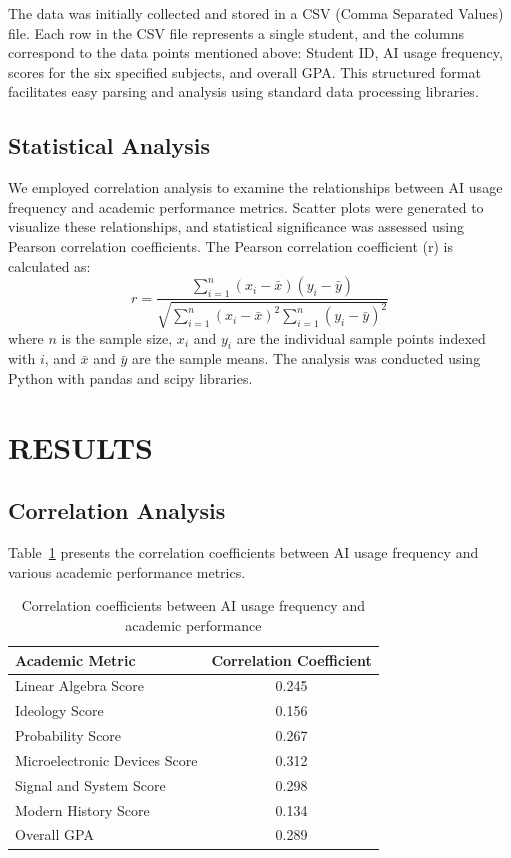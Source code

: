 \documentclass[manuscript,screen,review]{acmart}
\begin{document}
The data was initially collected and stored in a CSV (Comma Separated Values) file. Each row in the CSV file represents a single student, and the columns correspond to the data points mentioned above: Student ID, AI usage frequency, scores for the six specified subjects, and overall GPA. This structured format facilitates easy parsing and analysis using standard data processing libraries.

\subsection{Statistical Analysis}

We employed correlation analysis to examine the relationships between AI usage frequency and academic performance metrics. Scatter plots were generated to visualize these relationships, and statistical significance was assessed using Pearson correlation coefficients. The Pearson correlation coefficient (r) is calculated as:
$$r = \frac{\sum_{i=1}^{n}(x_i - \bar{x})(y_i - \bar{y})}{\sqrt{\sum_{i=1}^{n}(x_i - \bar{x})^2 \sum_{i=1}^{n}(y_i - \bar{y})^2}}$$
where $n$ is the sample size, $x_i$ and $y_i$ are the individual sample points indexed with $i$, and $\bar{x}$ and $\bar{y}$ are the sample means. The analysis was conducted using Python with pandas and scipy libraries.

\section{RESULTS}

\subsection{Correlation Analysis}

Table~\ref{tab:correlations} presents the correlation coefficients between AI usage frequency and various academic performance metrics.

\begin{table}[h]
\centering
\caption{Correlation coefficients between AI usage frequency and academic performance}
\label{tab:correlations}
\begin{tabular}{@{}lc@{}}
\toprule
Academic Metric & Correlation Coefficient \\
\midrule
Linear Algebra Score & 0.245 \\
Ideology Score & 0.156 \\
Probability Score & 0.267 \\
Microelectronic Devices Score & 0.312 \\
Signal and System Score & 0.298 \\
Modern History Score & 0.134 \\
Overall GPA & 0.289 \\
\bottomrule
\end{tabular}
\end{table}
\end{document}
